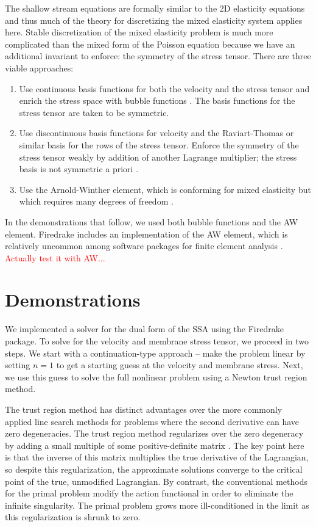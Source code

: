 \documentclass{article}
\theoremstyle{definition}
\theoremstyle{plain}
\begin{document}
The shallow stream equations are formally similar to the 2D elasticity equations and thus much of the theory for discretizing the mixed elasticity system applies here.
Stable discretization of the mixed elasticity problem is much more complicated than the mixed form of the Poisson equation because we have an additional invariant to enforce: the symmetry of the stress tensor.
There are three viable approaches:
\begin{enumerate}
    \item Use continuous basis functions for both the velocity and the stress tensor and enrich the stress space with bubble functions \citep{brezzi1993mixed}.
        The basis functions for the stress tensor are taken to be symmetric.
    \item Use discontinuous basis functions for velocity and the Raviart-Thomas or similar basis for the rows of the stress tensor.
        Enforce the symmetry of the stress tensor weakly by addition of another Lagrange multiplier; the stress basis is not symmetric a priori \citep{arnold1984peers}.
    \item Use the Arnold-Winther element, which is conforming for mixed elasticity but which requires many degrees of freedom \citep{arnold2002mixed}.
\end{enumerate}
In the demonstrations that follow, we used both bubble functions and the AW element.
Firedrake includes an implementation of the AW element, which is relatively uncommon among software packages for finite element analysis \citep{aznaran2021transformations}.
\textcolor{red}{Actually test it with AW...}


\section{Demonstrations}

We implemented a solver for the dual form of the SSA using the Firedrake package.
To solve for the velocity and membrane stress tensor, we proceed in two steps.
We start with a continuation-type approach -- make the problem linear by setting $n = 1$ to get a starting guess at the velocity and membrane stress.
Next, we use this guess to solve the full nonlinear problem using a Newton trust region method.

The trust region method has distinct advantages over the more commonly applied line search methods for problems where the second derivative can have zero degeneracies.
The trust region method regularizes over the zero degeneracy by adding a small multiple of some positive-definite matrix \citep{conn2000trust}.
The key point here is that the inverse of this matrix multiplies the true derivative of the Lagrangian, so despite this regularization, the approximate solutions converge to the critical point of the true, unmodified Lagrangian.
By contrast, the conventional methods for the primal problem modify the action functional in order to eliminate the infinite singularity.
The primal problem grows more ill-conditioned in the limit as this regularization is shrunk to zero.
\end{document}
